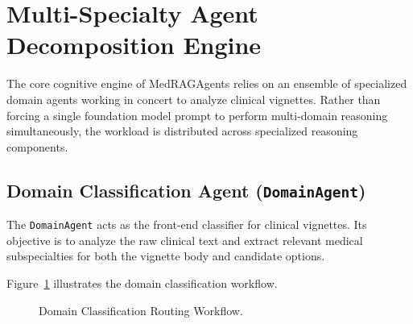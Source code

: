 \section{Multi-Specialty Agent Decomposition Engine}
\label{sec:multi_agent_engine}

The core cognitive engine of MedRAGAgents relies on an ensemble of specialized domain agents working in concert to analyze clinical vignettes. Rather than forcing a single foundation model prompt to perform multi-domain reasoning simultaneously, the workload is distributed across specialized reasoning components.

\subsection{Domain Classification Agent (\texttt{DomainAgent})}

The \texttt{DomainAgent} acts as the front-end classifier for clinical vignettes. Its objective is to analyze the raw clinical text and extract relevant medical subspecialties for both the vignette body and candidate options.

Figure~\ref{fig:domain_routing} illustrates the domain classification workflow.

\begin{figure}[htbp]
\centering
{}
\caption{Domain Classification Routing Workflow.}
\label{fig:domain_routing}
\end{figure}

